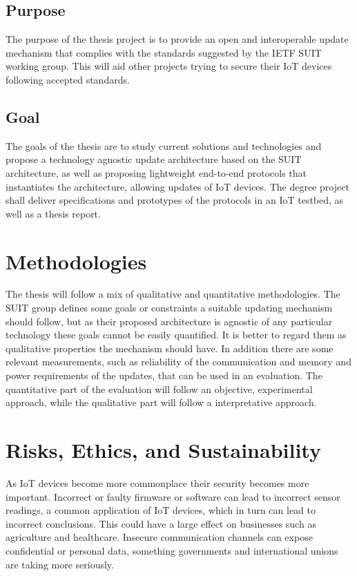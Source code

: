\documentclass[0-thesis.tex]{subfiles}
\begin{document}
\subsection{Purpose}
\label{ssec:purpose}
The purpose of the thesis project is to provide an open and interoperable update mechanism
that complies with the standards suggested by the IETF SUIT working group. This will aid
other projects trying to secure their IoT devices following accepted standards.

\subsection{Goal}
\label{ssec:goal}
The goals of the thesis are to study current solutions and technologies and propose a
technology agnostic update architecture based on the SUIT architecture, as well as
proposing lightweight end-to-end protocols that instantiates the architecture, allowing
updates of IoT devices. The degree project shall deliver specifications and prototypes of
the protocols in an IoT testbed, as well as a thesis report.

\section{Methodologies}
\label{sec:methodologies}
The thesis will follow a mix of qualitative and quantitative methodologies. The SUIT group
defines some goals or constraints a suitable updating mechanism should follow, but as
their proposed architecture is agnostic of any particular technology these goals cannot be
easily quantified. It is better to regard them as qualitative properties the mechanism
should have. In addition there are some relevant measurements, such as reliability of the
communication and memory and power requirements of the updates, that can be used in an
evaluation. The quantitative part of the evaluation will follow an objective, experimental
approach, while the qualitative part will follow a interpretative approach.

\section{Risks, Ethics, and Sustainability}
\label{sec:risks-ethics-sustainability}
As IoT devices become more commonplace their security becomes more important. Incorrect or
faulty firmware or software can lead to incorrect sensor readings, a common application of
IoT devices, which in turn can lead to incorrect conclusions. This could have a large
effect on businesses such as agriculture and healthcare. Insecure communication channels
can expose confidential or personal data, something governments and international unions
are taking more seriously. 
\end{document}
